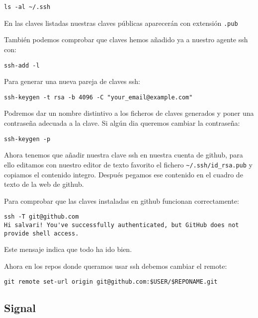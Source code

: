 \documentclass[
  12pt,
  spanish,
]{article}
\begin{document}
\begin{verbatim}
ls -al ~/.ssh
\end{verbatim}

En las claves listadas nuestras claves públicas aparecerán con extensión
\texttt{.pub}

También podemos comprobar que claves hemos añadido ya a nuestro agente
ssh con:

\begin{verbatim}
ssh-add -l
\end{verbatim}

Para generar una nueva pareja de claves ssh:

\begin{verbatim}
ssh-keygen -t rsa -b 4096 -C "your_email@example.com"
\end{verbatim}

Podremos dar un nombre distintivo a los ficheros de claves generados y
poner una contraseña adecuada a la clave. Si algún dia queremos cambiar
la contraseña:

\begin{verbatim}
ssh-keygen -p
\end{verbatim}

Ahora tenemos que añadir nuestra clave ssh en nuestra cuenta de github,
para ello editamos con nuestro editor de texto favorito el fichero
\texttt{\textasciitilde{}/.ssh/id\_rsa.pub} y copiamos el contenido
integro. Después pegamos ese contenido en el cuadro de texto de la web
de github.

Para comprobar que las claves instaladas en github funcionan
correctamente:

\begin{verbatim}
ssh -T git@github.com
Hi salvari! You've successfully authenticated, but GitHub does not provide shell access.
\end{verbatim}

Este mensaje indica que todo ha ido bien.

Ahora en los repos donde queramos usar ssh debemos cambiar el remote:

\begin{verbatim}
git remote set-url origin git@github.com:$USER/$REPONAME.git
\end{verbatim}

\hypertarget{signal}{%
\subsection{Signal}\label{signal}}
\end{document}
